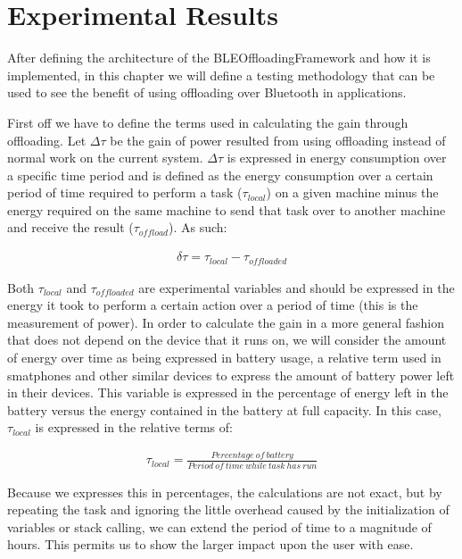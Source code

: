 \chapter{Experimental Results}
\label{chapter:results}

After defining the architecture of the BLEOffloadingFramework and how it is implemented, in this chapter we will define a testing methodology that can be used to see the benefit of using offloading over Bluetooth in applications.

First off we have to define the terms used in calculating the gain through offloading. Let \(\Delta\tau\) be the gain of power resulted from using offloading instead of normal work on the current system. \(\Delta\tau\) is expressed in energy consumption over a specific time period and is defined as the energy consumption over a certain period of time required to perform a task (\(\tau_{local}\)) on a given machine minus the energy required on the same machine to send that task over to another machine and receive the result (\(\tau_{offload}\)). As such:

\begin{align*}\label{gainequation}
\delta\tau = \tau_{local} - \tau_{offloaded}
\end{align*}

Both \(\tau_{local}\) and \(\tau_{offloaded}\) are experimental variables and should be expressed in the energy it took to perform a certain action over a period of time (this is the measurement of power). In order to calculate the gain in a more general fashion that does not depend on the device that it runs on, we will consider the amount of energy over time as being expressed in battery usage, a relative term used in smatphones and other similar devices to express the amount of battery power left in their devices. This variable is expressed in the percentage of energy left in the battery versus the energy contained in the battery at full capacity. In this case, \(\tau_{local}\) is expressed in the relative terms of:

\begin{align*}
\tau_{local} = \tfrac{Percentage\ of\ battery}{Period\ of\ time\ while\ task\ has\ run}
\end{align*}

Because we expresses this in percentages, the calculations are not exact, but by repeating the task and ignoring the little overhead caused by the initialization of variables or stack calling, we can extend the period of time to a magnitude of hours. This permits us to show the larger impact upon the user with ease.

